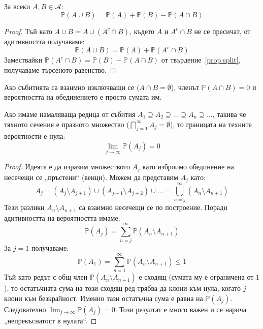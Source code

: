 \begin{cor}\label{cor:union2}
За всеки $A, B \in \mathcal{A}$:
\[ \mathbb{P}(A \cup B) = \mathbb{P}(A) + \mathbb{P}(B) - \mathbb{P}(A \cap B) \]
\end{cor}
\begin{proof}
Тъй като $A \cup B = A \cup (A^c \cap B)$, където $A$ и $A^c \cap B$ не се пресичат, от адитивността получаваме:
\[ \mathbb{P}(A \cup B) = \mathbb{P}(A) + \mathbb{P}(A^c \cap B) \]
Замествайки $\mathbb{P}(A^c \cap B) = \mathbb{P}(B) - \mathbb{P}(A \cap B)$ от твърдение~\ref{prop:split}, получаваме търсеното равенство.
\end{proof}

Ако събитията са взаимно изключващи се ($A \cap B = \emptyset$), членът $\mathbb{P}(A \cap B) = 0$ и вероятността на обединението е просто сумата им.

\begin{prop}\label{prop:cont0}
Ако имаме намаляваща редица от събития $A_1 \supseteq A_2 \supseteq \dots \supseteq A_n \supseteq \dots$, такива че тяхното сечение е празното множество ($\bigcap_{j=1}^\infty A_j = \emptyset$), то границата на техните вероятности е нула:
\[ \lim_{j \to \infty} \mathbb{P}(A_j) = 0 \]
\end{prop}
\begin{proof}
Идеята е да изразим множеството $A_j$ като изброимо обединение на несечещи се „пръстени“ (венци). Можем да представим $A_j$ като:
\[ A_j = (A_j \setminus A_{j+1}) \cup (A_{j+1} \setminus A_{j+2}) \cup \dots = \bigcup_{n=j}^{\infty} (A_n \setminus A_{n+1}) \]
Тези разлики $A_n \setminus A_{n+1}$ са взаимно несечещи се по построение. Поради адитивността на вероятността имаме:
\[ \mathbb{P}(A_j) = \sum_{n=j}^{\infty} \mathbb{P}(A_n \setminus A_{n+1}) \]
За $j=1$ получаваме:
\[ \mathbb{P}(A_1) = \sum_{n=1}^{\infty} \mathbb{P}(A_n \setminus A_{n+1}) \le 1 \]
Тъй като редът с общ член $\mathbb{P}(A_n \setminus A_{n+1})$ е сходящ (сумата му е ограничена от $1$), то остатъчната сума на този сходящ ред трябва да клони към нула, когато $j$ клони към безкрайност. Именно тази остатъчна сума е равна на $\mathbb{P}(A_j)$. Следователно $\lim_{j \to \infty} \mathbb{P}(A_j) = 0$. Този резултат е много важен и се нарича „непрекъснатост в нулата“.
\end{proof}

